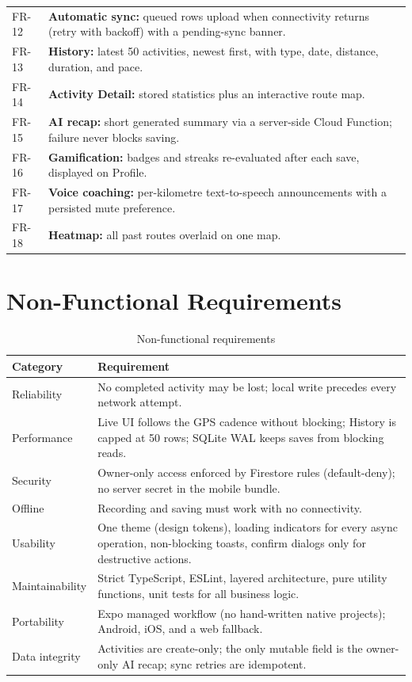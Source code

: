 \documentclass[12pt, a4paper]{report}
\begin{document}
\begin{table}[H]
\begin{tabularx}{\textwidth}{@{}l L@{}}
FR-12 & \textbf{Automatic sync:} queued rows upload when connectivity
        returns (retry with backoff) with a pending-sync banner. \\
FR-13 & \textbf{History:} latest 50 activities, newest first, with type,
        date, distance, duration, and pace. \\
FR-14 & \textbf{Activity Detail:} stored statistics plus an interactive
        route map. \\
FR-15 & \textbf{AI recap:} short generated summary via a server-side Cloud
        Function; failure never blocks saving. \\
FR-16 & \textbf{Gamification:} badges and streaks re-evaluated after each
        save, displayed on Profile. \\
FR-17 & \textbf{Voice coaching:} per-kilometre text-to-speech announcements
        with a persisted mute preference. \\
FR-18 & \textbf{Heatmap:} all past routes overlaid on one map. \\
\bottomrule
\end{tabularx}
\end{table}

\section{Non-Functional Requirements}
\begin{table}[H]
\centering
\caption{Non-functional requirements}
\label{tab:nfr}
\small
\begin{tabularx}{\textwidth}{@{}l L@{}}
\toprule
\textbf{Category} & \textbf{Requirement} \\
\midrule
Reliability & No completed activity may be lost; local write precedes every
  network attempt. \\
Performance & Live UI follows the GPS cadence without blocking; History is
  capped at 50 rows; SQLite WAL keeps saves from blocking reads. \\
Security & Owner-only access enforced by Firestore rules (default-deny);
  no server secret in the mobile bundle. \\
Offline & Recording and saving must work with no connectivity. \\
Usability & One theme (design tokens), loading indicators for every async
  operation, non-blocking toasts, confirm dialogs only for destructive
  actions. \\
Maintainability & Strict TypeScript, ESLint, layered architecture, pure
  utility functions, unit tests for all business logic. \\
Portability & Expo managed workflow (no hand-written native projects);
  Android, iOS, and a web fallback. \\
Data integrity & Activities are create-only; the only mutable field is the
  owner-only AI recap; sync retries are idempotent. \\
\bottomrule
\end{tabularx}
\end{table}
\end{document}
